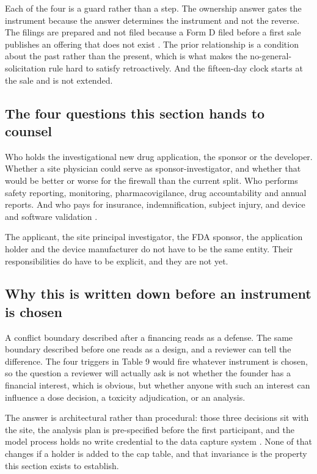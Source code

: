 Each of the four is a guard rather than a step. The ownership answer gates the
instrument because the answer determines the instrument and not the reverse. The
filings are prepared and not filed because a Form D filed before a first sale
publishes an offering that does not exist \cite{secformd2026}. The prior
relationship is a condition about the past rather than the present, which is what
makes the no-general-solicitation rule hard to satisfy retroactively. And the
fifteen-day clock starts at the sale and is not extended.

\subsection{The four questions this section hands to counsel}

Who holds the investigational new drug application, the sponsor or the developer.
Whether a site physician could serve as sponsor-investigator, and whether that
would be better or worse for the firewall than the current split. Who performs
safety reporting, monitoring, pharmacovigilance, drug accountability and annual
reports. And who pays for insurance, indemnification, subject injury, and device
and software validation \cite{ecfr2026part312records}.

The applicant, the site principal investigator, the FDA sponsor, the application
holder and the device manufacturer do not have to be the same entity. Their
responsibilities do have to be explicit, and they are not yet.

\subsection{Why this is written down before an instrument is chosen}

A conflict boundary described after a financing reads as a defense. The same
boundary described before one reads as a design, and a reviewer can tell the
difference. The four triggers in Table 9 would fire whatever instrument is
chosen, so the question a reviewer will actually ask is not whether the founder
has a financial interest, which is obvious, but whether anyone with such an
interest can influence a dose decision, a toxicity adjudication, or an analysis.

The answer is architectural rather than procedural: those three decisions sit
with the site, the analysis plan is pre-specified before the first participant,
and the model process holds no write credential to the data capture system
\cite{onpremwhippl}. None of that changes if a holder is added to the cap table,
and that invariance is the property this section exists to establish.

